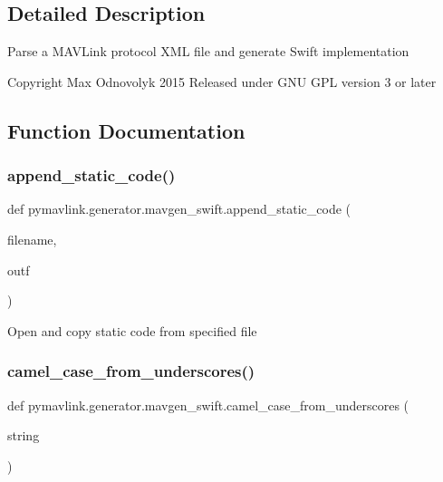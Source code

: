 \subsection{Detailed Description}
\begin{DoxyVerb}Parse a MAVLink protocol XML file and generate Swift implementation

Copyright Max Odnovolyk 2015
Released under GNU GPL version 3 or later
\end{DoxyVerb}
 

\subsection{Function Documentation}
\mbox{\label{namespacepymavlink_1_1generator_1_1mavgen__swift_a44b1af0ce3b6338825d40002eb8dd76a}} 
\subsubsection{\texorpdfstring{append\+\_\+static\+\_\+code()}{append\_static\_code()}}
{\footnotesize\ttfamily def pymavlink.\+generator.\+mavgen\+\_\+swift.\+append\+\_\+static\+\_\+code (\begin{DoxyParamCaption}\item[{}]{filename,  }\item[{}]{outf }\end{DoxyParamCaption})}

\begin{DoxyVerb}Open and copy static code from specified file\end{DoxyVerb}
 \mbox{\label{namespacepymavlink_1_1generator_1_1mavgen__swift_a3be145e5779805512d208e0a874649f5}} 
\subsubsection{\texorpdfstring{camel\+\_\+case\+\_\+from\+\_\+underscores()}{camel\_case\_from\_underscores()}}
{\footnotesize\ttfamily def pymavlink.\+generator.\+mavgen\+\_\+swift.\+camel\+\_\+case\+\_\+from\+\_\+underscores (\begin{DoxyParamCaption}\item[{}]{string }\end{DoxyParamCaption})}

